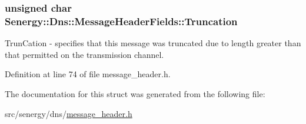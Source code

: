 \hypertarget{struct_senergy_1_1_dns_1_1_message_header_fields_a15d1ee99bf788c080001c3216c88274c}{
\subsubsection[{Truncation}]{\setlength{\rightskip}{0pt plus 5cm}unsigned char Senergy\-::\-Dns\-::\-Message\-Header\-Fields\-::\-Truncation}}\label{struct_senergy_1_1_dns_1_1_message_header_fields_a15d1ee99bf788c080001c3216c88274c}


Trun\-Cation -\/ specifies that this message was truncated due to length greater than that permitted on the transmission channel. 



Definition at line 74 of file message\-\_\-header.\-h.



The documentation for this struct was generated from the following file\-:\begin{DoxyCompactItemize}
\item 
src/senergy/dns/\hyperlink{message__header_8h}{message\-\_\-header.\-h}\end{DoxyCompactItemize}
